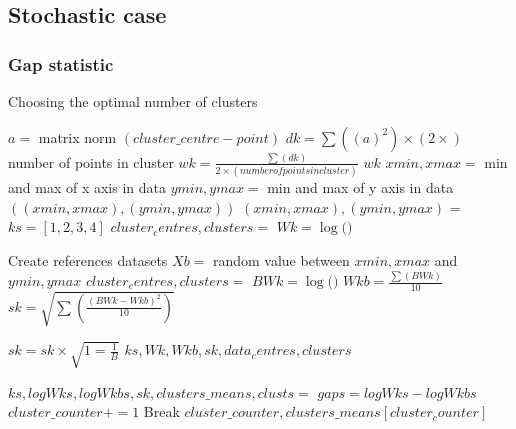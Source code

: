\subsection{Stochastic case}
\subsubsection{Gap statistic}
\begin{algorithm}
\caption{Choosing the optimal number of clusters}
 \begin{algorithmic}[1]
    \Statex
    
    			\State $a = $ matrix norm $(cluster\_centre - point)$    			
    		\EndFor
    		\State $dk = \sum((a)^2 )\times (2 \times )$ number of points in cluster
    	\EndFor
    	\State $wk = \frac{ \sum(dk)}{2 \times (number of points in cluster)} $
    	\State \Return $wk$
    \EndFunction
    \Statex  
    	\State $xmin, xmax = $ min and max of x axis in data
    	\State $ymin, ymax = $ min and max of y axis in data
    	\State \Return $((xmin, xmax), (ymin, ymax)) $
    \EndFunction
    \Statex
    	$(xmin, xmax), (ymin, ymax)$ = %
    	\State $ks = [1,2,3,4]$
   			\State $cluster_centres, clusters = $ 
   			\State $Wk = \log($$)$
   			
   			\State Create references datasets
   					\State $Xb = $ random value between $xmin, xmax$ and $ymin, ymax$
   				\EndFor
				\State $cluster_centres, clusters = $ 
  				\State $BWk = \log($$)$
   			\EndFor   
   			\State $Wkb = \frac{\sum(BWk)}{10} $	
   			\State $sk = \sqrt{\sum(\frac{(BWk - Wkb)^2}{10})}$	
   				
    	\EndFor
    	\State $sk = sk \times \sqrt{1=\frac{1}{B}}$
    	\State \Return $ks, Wk, Wkb, sk, data_centres, clusters$
    \EndFunction
    
    \Statex
		    \State $ks, logWks, logWkbs, sk, clusters\_means, clusts = $
		    	\State $gaps = logWks - logWkbs$
		    \EndFor
		    	\State $cluster\_counter += 1$ 
		    	\EndIf
		    		\State Break 
		    	\EndIf
		    \EndFor
	\State \Return $cluster\_counter, clusters\_means[cluster_counter]$
	\EndFunction


  \end{algorithmic}
\end{algorithm}


